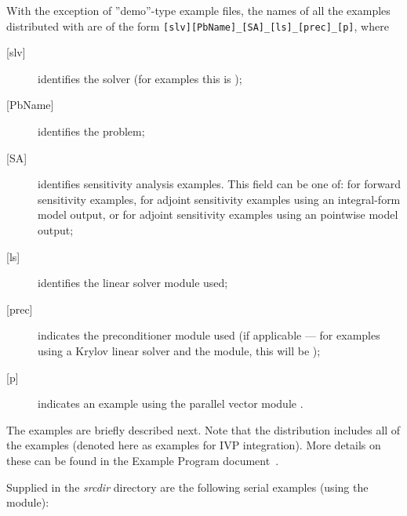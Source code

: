 \vspace{0.2in}\noindent
With the exception of ''demo''-type example files, the names of all the examples 
distributed with {\sundials} are of the form \verb![slv][PbName]_[SA]_[ls]_[prec]_[p]!, 
where
\begin{description}
\item [{[slv]}] identifies the solver (for {\idas} examples this is );
\item [{[PbName]}] identifies the problem;
\item [{[SA]}] identifies sensitivity analysis examples. This field can be one
  of:  for forward sensitivity examples,  for adjoint sensitivity
  examples using an integral-form model output, or  for adjoint sensitivity
  examples using an pointwise model output;
\item [{[ls]}] identifies the linear solver module used;
\item [{[prec]}] indicates the {\idas} preconditioner module used
  (if applicable --- for examples using a Krylov linear solver
  and the {\idabbdpre} module, this will be );
\item [{[p]}] indicates an example using the parallel vector module {\nvecp}.
\end{description}

\vspace{0.2in}\noindent
The examples are briefly described next.
Note that the {\idas} distribution includes all of the {\ida} {\CC}
examples (denoted here as examples for IVP integration). More details on
these can be found in the {\ida} Example Program document~\cite{ida_ex}.


\vspace{0.2in}\noindent
Supplied in the {\em srcdir} directory are the
following serial examples (using the {\nvecs} module):

